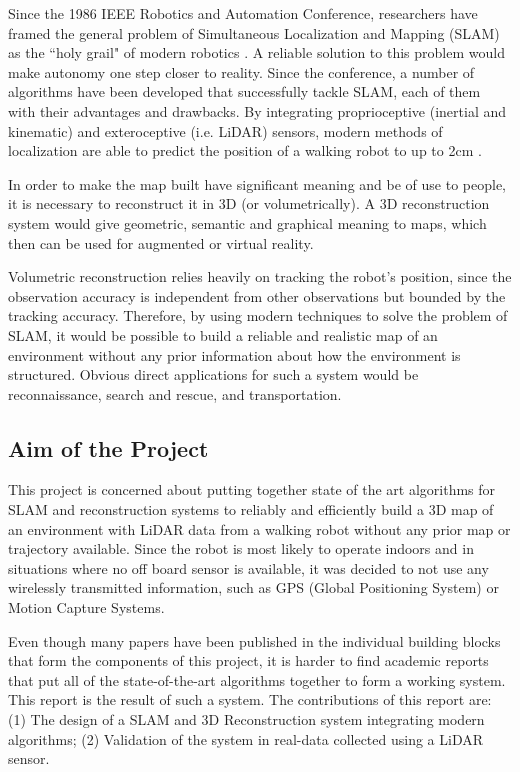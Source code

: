 \documentclass[12pt]{article}
\begin{document}
Since the 1986 IEEE Robotics and Automation Conference, researchers have framed the general problem of Simultaneous Localization and Mapping (SLAM) as the ``holy grail" of modern robotics \cite{SLAMPartI}. A reliable solution to this problem would make autonomy one step closer to reality. Since the conference, a number of algorithms have been developed that successfully tackle SLAM, each of them with their advantages and drawbacks. By integrating proprioceptive (inertial and kinematic) and exteroceptive (i.e. LiDAR) sensors, modern methods of localization are able to predict the position of a walking robot to up to 2cm \cite{7041346}.
	
In order to make the map built have significant meaning and be of use to people, it is necessary to reconstruct it in 3D (or volumetrically). A 3D reconstruction system would give geometric, semantic and graphical meaning to maps, which then can be used for augmented or virtual reality.
	
Volumetric reconstruction relies heavily on tracking the robot's position, since the observation accuracy is independent from other observations but bounded by the tracking accuracy. Therefore, by using modern techniques to solve the problem of SLAM, it would be possible to build a reliable and realistic map of an environment without any prior information about how the environment is structured. Obvious direct applications for such a system would be reconnaissance, search and rescue, and transportation.
	
	\subsection{Aim of the Project}

This project is concerned about putting together state of the art algorithms for SLAM and reconstruction systems to reliably and efficiently build a 3D map of an environment with LiDAR data from a walking robot without any prior map or trajectory available. Since the robot is most likely to operate indoors and in situations where no off board sensor is available, it was decided to not use any wirelessly transmitted information, such as GPS (Global Positioning System) or Motion Capture Systems.
	
Even though many papers have been published in the individual building blocks that form the components of this project, it is harder to find academic reports that put all of the state-of-the-art algorithms together to form a working system. This report is the result of such a system. The contributions of this report are: (1) The design of a SLAM and 3D Reconstruction system integrating modern algorithms; (2) Validation of the system in real-data collected using a LiDAR sensor.
	
\end{document}
